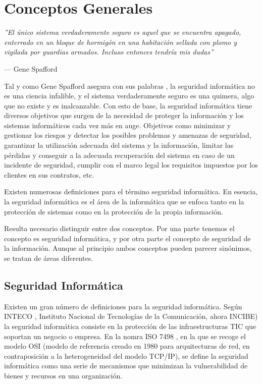 \chapter{Conceptos Generales}

\epigraph{\textit{''El único sistema verdaderamente seguro es aquel que se encuentra apagado, enterrado en un bloque de hormigón en una habitación sellada con plomo y vigilada por guardias armados. Incluso entonces tendría mis dudas''}}{--- Gene Spafford}

Tal y como Gene Spafford asegura con sus palabras \cite{gene-spafford}, la seguridad informática no es una ciencia infalible, y el sistema verdaderamente seguro es una quimera, algo que no existe y es inalcanzable. Con esto de base, la seguridad informática tiene diversos objetivos que surgen de la necesidad de proteger la información y los sistemas informáticos cada vez más en auge. Objetivos como minimizar y gestionar los riesgos y detectar los posibles problemas y amenazas de seguridad, garantizar la utilización adecuada del sistema y la información, limitar las pérdidas y conseguir a la adecuada recuperación del sistema en caso de un incidente de seguridad, cumplir con el marco legal los requisitos impuestos por los clientes en sus contratos, etc.

Existen numerosas definiciones para el término seguridad informática. En esencia, la seguridad informática es el área de la informática que se enfoca tanto en la protección de sistemas como en la protección de la propia información.

Resulta necesario distinguir entre dos conceptos. Por una parte tenemos el concepto es seguridad informática, y por otra parte el concepto de seguridad de la información. Aunque al principio ambos conceptos pueden parecer sinónimos, se tratan de áreas diferentes.


\section{Seguridad Informática}

Existen un gran número de definiciones para la seguridad informática. Según INTECO \cite{inteco-defs}, Instituto Nacional de Tecnologías de la Comunicación, ahora INCIBE) la seguridad informática consiste en la protección de las infraestructuras TIC que soportan un negocio o empresa. En la nomra ISO 7498 \cite{iso-7498}, en la que se recoge el modelo OSI (modelo de referencia creado en 1980 para arquitecturas de red, en contraposición a la heterogeneidad del modelo TCP/IP), se define la seguridad informática como una serie de mecanismos que minimizan la vulnerabilidad de bienes y recursos en una organización.

